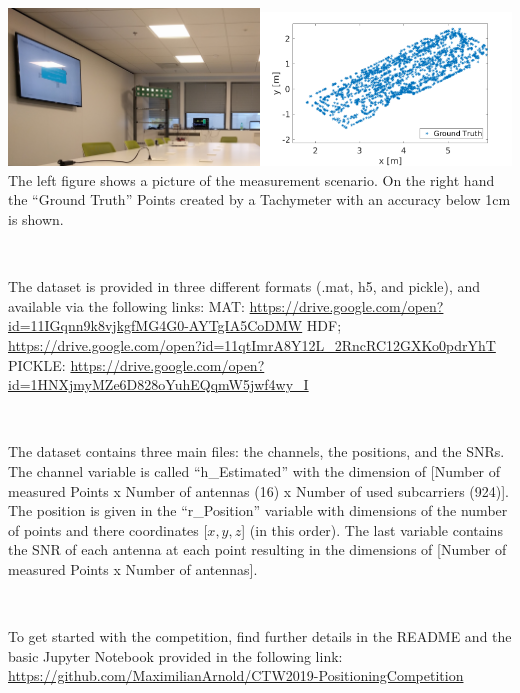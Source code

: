 \documentclass[letter]{moderncv} %
\begin{document}
\includegraphics[width=0.5\textwidth]{ParisEnvironment}\includegraphics[width=0.5\textwidth]{IndoorDataset}
The left figure shows a picture of the measurement scenario. On the right hand the ``Ground Truth'' Points created by a Tachymeter with an accuracy below 1cm is shown.
\vspace{4ex}


~

The dataset is provided in three different formats (.mat, h5, and pickle), and    available via the following links: \newline
  MAT:    \url{https://drive.google.com/open?id=11IGqnn9k8vjkgfMG4G0-AYTgIA5CoDMW} \newline
  HDF;    \url{https://drive.google.com/open?id=11qtImrA8Y12L_2RncRC12GXKo0pdrYhT} \newline
  PICKLE: \url{https://drive.google.com/open?id=1HNXjmyMZe6D828oYuhEQqmW5jwf4wy_I} \newline

~

The dataset contains three main files: the channels, the positions, and the SNRs. The channel variable is called ``h\_Estimated'' with the dimension of [Number of measured Points x Number of antennas (16) x Number of used subcarriers (924)]. The position is given in the ``r\_Position'' variable with dimensions of the number of points  and there coordinates [$x,y,z$] (in this order). The last variable contains the SNR of each antenna at each point resulting in the dimensions 
of [Number of measured Points x Number of antennas].

~


To get started with the competition, find further details in the README and the basic Jupyter Notebook provided in the following link:\newline
\url{https://github.com/MaximilianArnold/CTW2019-PositioningCompetition}
\end{document}
